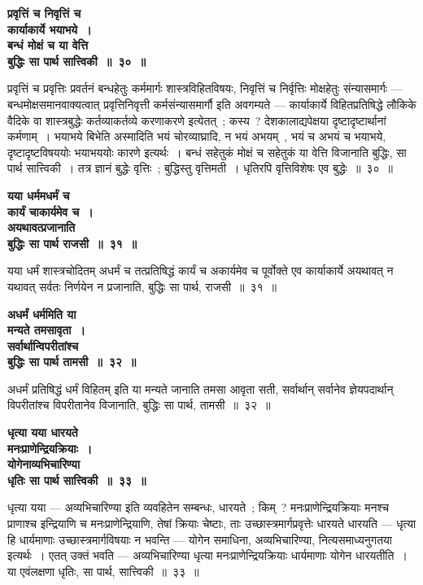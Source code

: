  \begin{center}{\bfseries प्रवृत्तिं च निवृत्तिं च\\ कार्याकार्ये भयाभये~।\\बन्धं मोक्षं च या वेत्ति\\ बुद्धिः सा पार्थ सात्त्विकी~॥~३०~॥}\end{center} 
प्रवृत्तिं च प्रवृत्तिः प्रवर्तनं बन्धहेतुः कर्ममार्गः शास्त्रविहितविषयः, निवृत्तिं च निर्वृत्तिः मोक्षहेतुः संन्यासमार्गः — बन्धमोक्षसमानवाक्यत्वात् प्रवृत्तिनिवृत्ती कर्मसंन्यासमार्गौ इति अवगम्यते — कार्याकार्ये विहितप्रतिषिद्धे लौकिके वैदिके वा शास्त्रबुद्धेः कर्तव्याकर्तव्ये करणाकरणे इत्येतत्~; कस्य~? देशकालाद्यपेक्षया दृष्टादृष्टार्थानां कर्मणाम्~। भयाभये बिभेति अस्मादिति भयं चोरव्याघ्रादि, न भयं अभयम्~, भयं च अभयं च भयाभये, दृष्टादृष्टविषययोः भयाभययोः कारणे इत्यर्थः~। बन्धं सहेतुकं मोक्षं च सहेतुकं या वेत्ति विजानाति बुद्धिः, सा पार्थ सात्त्विकी~। तत्र ज्ञानं बुद्धेः वृत्तिः~; बुद्धिस्तु वृत्तिमती~। धृतिरपि वृत्तिविशेषः एव बुद्धेः~॥~३०~॥\par
 \begin{center}{\bfseries यया धर्ममधर्मं च\\ कार्यं चाकार्यमेव च~।\\ अयथावत्प्रजानाति\\ बुद्धिः सा पार्थ राजसी~॥~३१~॥}\end{center} 
यया धर्मं शास्त्रचोदितम् अधर्मं च तत्प्रतिषिद्धं कार्यं च अकार्यमेव च पूर्वोक्ते एव कार्याकार्ये अयथावत् न यथावत् सर्वतः निर्णयेन न प्रजानाति, बुद्धिः सा पार्थ, राजसी~॥~३१~॥\par
 \begin{center}{\bfseries अधर्मं धर्ममिति या\\ मन्यते तमसावृता~।\\सर्वार्थान्विपरीतांश्च\\ बुद्धिः सा पार्थ तामसी~॥~३२~॥}\end{center} 
अधर्मं प्रतिषिद्धं धर्मं विहितम् इति या मन्यते जानाति तमसा आवृता सती, सर्वार्थान् सर्वानेव ज्ञेयपदार्थान् विपरीतांश्च विपरीतानेव विजानाति, बुद्धिः सा पार्थ, तामसी~॥~३२~॥\par
 \begin{center}{\bfseries धृत्या यया धारयते\\ मनःप्राणेन्द्रियक्रियाः~।\\योगेनाव्यभिचारिण्या\\ धृतिः सा पार्थ सात्त्विकी~॥~३३~॥}\end{center} 
धृत्या यया — अव्यभिचारिण्या इति व्यवहितेन सम्बन्धः, धारयते~; किम्~? मनःप्राणेन्द्रियक्रियाः मनश्च प्राणाश्च इन्द्रियाणि च मनःप्राणेन्द्रियाणि, तेषां क्रियाः चेष्टाः, ताः उच्छास्त्रमार्गप्रवृत्तेः धारयते धारयति — धृत्या हि धार्यमाणाः उच्छास्त्रमार्गविषयाः न भवन्ति — योगेन समाधिना, अव्यभिचारिण्या, नित्यसमाध्यनुगतया इत्यर्थः~। एतत् उक्तं भवति — अव्यभिचारिण्या धृत्या मनःप्राणेन्द्रियक्रियाः धार्यमाणाः योगेन धारयतीति~। या एवंलक्षणा धृतिः, सा पार्थ, सात्त्विकी~॥~३३~॥\par
